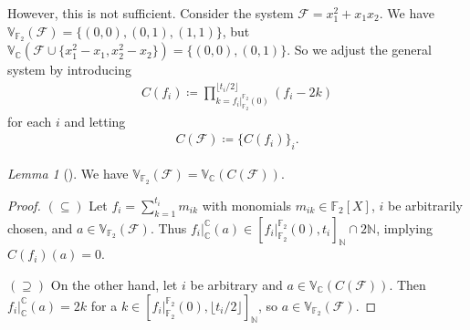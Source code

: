 \documentclass[10pt]{amsart}
\theoremstyle{definition}
\theoremstyle{remark}
\newtheorem{lemma}[theorem]{Lemma}
\begin{document}
    However, this is not sufficient. Consider the system \(\mathcal{F} = x_1^2+x_1x_2\). We have \(\mathbb{V}_{\mathbb{F}_2}(\mathcal{F}) = \{(0, 0), (0, 1), (1, 1)\}\), but \(\mathbb{V}_{\mathbb{C}}(\mathcal{F} \cup \{x_1^2-x_1, x_2^2-x_2\}) = \{(0, 0), (0, 1)\}\). So we adjust the general system by introducing
    \begin{align}
        C(f_i) \coloneqq \prod_{k=f_i|_{\mathbb{F}_2}^{\mathbb{F}_2}(0)}^{\lfloor t_i/2 \rfloor} (f_i-2k)
    \end{align}
    for each \(i\) and letting
    \begin{align}
        C(\mathcal{F}) \coloneqq \{C(f_i)\}_i.
    \end{align}
    \begin{lemma}[{\cite[p. 23]{Chen_2021}}]
        We have \(\mathbb{V}_{\mathbb{F}_2}(\mathcal{F}) = \mathbb{V}_{\mathbb{C}}(C(\mathcal{F}))\).
    \end{lemma}
    \begin{proof}
        \((\subseteq)\) Let \(f_i = \sum_{k=1}^{t_i} m_{ik}\) with monomials \(m_{ik} \in \mathbb{F}_2[X]\), \(i\) be arbitrarily chosen, and \(a \in \mathbb{V}_{\mathbb{F}_2}(\mathcal{F})\). Thus \(f_i|_{\mathbb{C}}^{\mathbb{C}}(a) \in [f_i|_{\mathbb{F}_2}^{\mathbb{F}_2}(0), t_i]_{\mathbb{N}} \cap 2\mathbb{N}\), implying \(C(f_i)(a) = 0\).

        \((\supseteq)\) On the other hand, let \(i\) be arbitrary and \(a \in \mathbb{V}_{\mathbb{C}}(C(\mathcal{F}))\). Then \(f_i|_{\mathbb{C}}^{\mathbb{C}}(a) = 2k\) for a \(k \in [f_i|_{\mathbb{F}_2}^{\mathbb{F}_2}(0), \lfloor t_i/2 \rfloor]_{\mathbb{N}}\), so \(a \in \mathbb{V}_{\mathbb{F}_2}(\mathcal{F})\).
    \end{proof}

    \printbibliography{}
\end{document}
